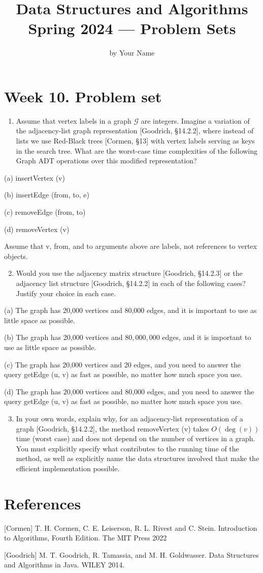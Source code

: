 \documentclass[10pt]{article}
\title{Data Structures and Algorithms Spring 2024 — Problem Sets }
\author{by Your Name}
\begin{document}
\maketitle


\section*{Week 10. Problem set}
\begin{enumerate}
  \item Assume that vertex labels in a graph $\mathcal{G}$ are integers. Imagine a variation of the adjacency-list graph representation [Goodrich, §14.2.2], where instead of lists we use Red-Black trees [Cormen, §13] with vertex labels serving as keys in the search tree. What are the worst-case time complexities of the following Graph ADT operations over this modified representation?
\end{enumerate}

(a) insertVertex (v)

(b) insertEdge (from, to, e)

(c) removeEdge (from, to)

(d) removeVertex (v)

Assume that v, from, and to arguments above are labels, not references to vertex objects.

\begin{enumerate}
  \setcounter{enumi}{1}
  \item Would you use the adjacency matrix structure [Goodrich, §14.2.3] or the adjacency list structure [Goodrich, §14.2.2] in each of the following cases? Justify your choice in each case.
\end{enumerate}

(a) The graph has 20,000 vertices and 80,000 edges, and it is important to use as little space as possible.

(b) The graph has 20,000 vertices and $80,000,000$ edges, and it is important to use as little space as possible.

(c) The graph has 20,000 vertices and 20 edges, and you need to answer the query getEdge (u, v) as fast as possible, no matter how much space you use.

(d) The graph has 20,000 vertices and 80,000 edges, and you need to answer the query getEdge (u, v) as fast as possible, no matter how much space you use.

\begin{enumerate}
  \setcounter{enumi}{2}
  \item In your own words, explain why, for an adjacency-list representation of a graph [Goodrich, §14.2.2], the method removeVertex (v) takes $O(\operatorname{deg}(v))$ time (worst case) and does not depend on the number of vertices in a graph. You must explicitly specify what contributes to the running time of the method, as well as explicitly name the data structures involved that make the efficient implementation possible.
\end{enumerate}

\section*{References}
[Cormen] T. H. Cormen, C. E. Leiserson, R. L. Rivest and C. Stein. Introduction to Algorithms, Fourth Edition. The MIT Press 2022

[Goodrich] M. T. Goodrich, R. Tamassia, and M. H. Goldwasser. Data Structures and Algorithms in Java. WILEY 2014.
\end{document}
